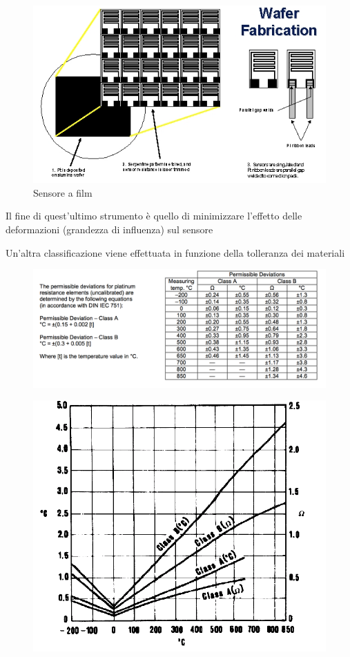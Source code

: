 \documentclass[a4paper, 15pt]{article}
\begin{document}
\begin{adjustwidth}{2in}{}
\begin{itemize}
\begin{figure}[H]
			\centering
			\includegraphics[width=0.3\linewidth]{immagini/screenshot010}
			\caption{Sensore a film}
			\label{fig:screenshot010}
		\end{figure}
		Il fine di quest'ultimo strumento è quello di minimizzare l'effetto delle deformazioni (grandezza di influenza) sul sensore		
	\end{itemize}
	Un'altra classificazione viene effettuata in funzione della tolleranza dei materiali
	\begin{figure}[H]
		\centering
		\includegraphics[width=0.5\linewidth]{immagini/screenshot011}
		\label{fig:screenshot011}
	\end{figure}
	\begin{figure}[H]
		\centering
		\includegraphics[width=0.5\linewidth]{immagini/screenshot012}
		\label{fig:screenshot012}
	\end{figure}
\end{adjustwidth}
\newpage
\end{document}
